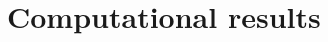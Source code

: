 \documentclass[preprint,12pt]{elsarticle}
\begin{document}
\newpage
\section{Computational results}
\label{sec:numerical results}
\end{document}
